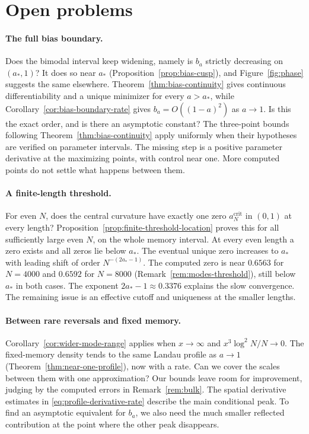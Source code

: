 \section{Open problems}\label{sec:open}

\paragraph{The full bias boundary.}
Does the bimodal interval keep widening, namely is $b_a$ strictly
decreasing on $(a_*,1)$? It does so near $a_*$
(Proposition~\ref{prop:bias-cusp}), and Figure~\ref{fig:phase}
suggests the same elsewhere. Theorem~\ref{thm:bias-continuity} gives
continuous differentiability and a unique minimizer for every $a>a_*$, while
Corollary~\ref{cor:bias-boundary-rate} gives
$b_a=O((1-a)^2)$ as $a\to1$. Is this the exact order, and is there
an asymptotic constant? The three-point bounds following
Theorem~\ref{thm:bias-continuity} apply uniformly when their hypotheses
are verified on parameter intervals. The missing step is a positive
parameter derivative at the maximizing points, with control near one.
More computed points do not settle what happens between them.

\paragraph{A finite-length threshold.}
For even $N$, does the central curvature have exactly one zero
$a_N^{\mathrm{crit}}$ in $(0,1)$ at every length?
Proposition~\ref{prop:finite-threshold-location} proves this for all
sufficiently large even $N$, on the whole memory interval.
At every even length a zero exists and all zeros lie below $a_*$.
The eventual unique zero increases to $a_*$ with leading shift of
order $N^{-(2a_*-1)}$.
The computed zero is near $0.6563$
for $N=4000$ and $0.6592$ for $N=8000$
(Remark~\ref{rem:modes-threshold}), still below $a_*$ in both cases.
The exponent $2a_*-1\approx0.3376$ explains the slow convergence.
The remaining issue is an effective cutoff and uniqueness at the
smaller lengths.

\paragraph{Between rare reversals and fixed memory.}
Corollary~\ref{cor:wider-mode-range} applies when
$x\to\infty$ and $x^3\log^2N/N\to0$.
The fixed-memory density tends to the same Landau profile as $a\to1$
(Theorem~\ref{thm:near-one-profile}), now with a rate.
Can we cover the scales between them with one approximation?
Our bounds leave room for improvement, judging by the computed errors
in Remark~\ref{rem:bulk}. The spatial derivative estimates in
\eqref{eq:profile-derivative-rate} describe the main conditional peak.
To find an asymptotic equivalent for $b_a$, we also need the much
smaller reflected contribution at the point where the other peak disappears.

